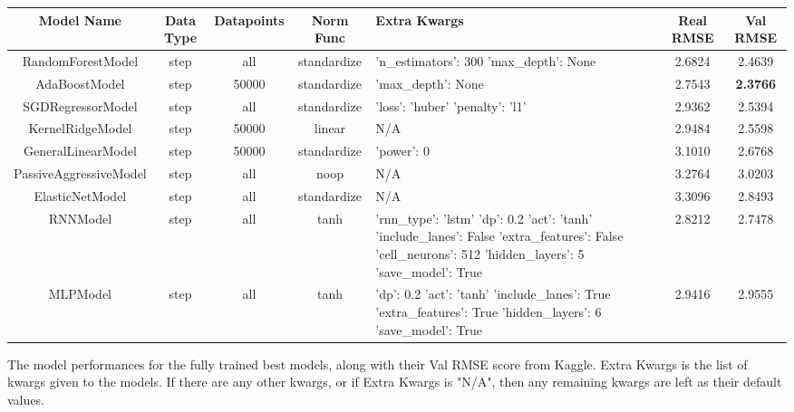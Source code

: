 \documentclass{article}
\newenvironment{changemargin}[2]{%
\begin{list}{}{%
\setlength{\topsep}{0pt}%
\setlength{\leftmargin}{#1}%
\setlength{\rightmargin}{#2}%
\setlength{\listparindent}{\parindent}%
\setlength{\itemindent}{\parindent}%
\setlength{\parsep}{\parskip}%
}%
\item[]}{\end{list}}
\begin{document}
\begin{changemargin}{-4.5cm}{-2cm}
\begin{minipage}{\linewidth}
\centering
{} \label{tab:title} 
\begin{tabular}{|c|c|c|c|p{4.5cm}|c|c| }\toprule[1.5pt]
Model Name & Data Type & Datapoints & Norm Func & Extra Kwargs & Real RMSE & Val RMSE \\\hline\hline
RandomForestModel & step & all & standardize & 'n\_estimators': 300 \newline 'max\_depth': None & 2.6824 & 2.4639 \\\hline
AdaBoostModel & step & 50000 & standardize & 'max\_depth': None & 2.7543 & \bf 2.3766 \\\hline
SGDRegressorModel & step & all & standardize & 'loss': 'huber' \newline 'penalty': 'l1' & 2.9362 & 2.5394 \\\hline
KernelRidgeModel & step & 50000 & linear & N/A & 2.9484 & 2.5598 \\\hline
GeneralLinearModel & step & 50000 & standardize & 'power': 0 & 3.1010 & 2.6768 \\\hline
PassiveAggressiveModel & step & all & noop & N/A & 3.2764 & 3.0203 \\\hline
ElasticNetModel & step & all & standardize & N/A & 3.3096 & 2.8493 \\\hline
RNNModel & step & all & tanh & 'rnn\_type': 'lstm' \newline 'dp': 0.2 \newline 'act': 'tanh' \newline 'include\_lanes': False \newline 'extra\_features': False \newline 'cell\_neurons': 512 \newline 'hidden\_layers': 5 \newline 'save\_model': True & 2.8212 & 2.7478 \\\hline
MLPModel & step & all & tanh & 'dp': 0.2 \newline 'act': 'tanh' \newline 'include\_lanes': True \newline 'extra\_features': True \newline 'hidden\_layers': 6 \newline 'save\_model': True & 2.9416 & 2.9555 \\\hline
\bottomrule[1.25pt]
\end {tabular}\par
\bigskip
The model performances for the fully trained best models, along with their Val RMSE score from Kaggle. Extra Kwargs is the list of kwargs given to the models. If there are any other kwargs, or if Extra Kwargs is "N/A", then any remaining kwargs are left as their default values.
\end{minipage}
\end{changemargin}
\end{document}
